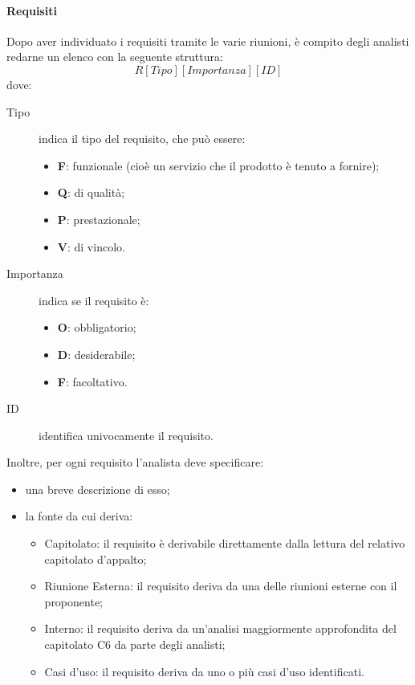 \paragraph{Requisiti} 
Dopo aver individuato i requisiti tramite le varie riunioni, è compito degli analisti redarne un elenco con la seguente struttura:
	\[R[Tipo][Importanza][ID]\]
dove:
\begin{description}
	\item[Tipo] indica il tipo del requisito, che può essere:
	\begin{itemize}
		\item \textbf{F}: funzionale (cioè un servizio che il prodotto è tenuto a fornire);
		\item \textbf{Q}: di qualità;
		\item \textbf{P}: prestazionale;
		\item \textbf{V}: di vincolo.
	\end{itemize}
	\item[Importanza] indica se il requisito è:
	\begin{itemize}
		\item \textbf{O}: obbligatorio;
		\item \textbf{D}: desiderabile;
		\item \textbf{F}: facoltativo. 
	\end{itemize}
	\item[ID] identifica univocamente il requisito.
\end{description}
Inoltre, per ogni requisito l'analista deve specificare:
\begin{itemize}
	\item una breve descrizione di esso;
	\item la fonte da cui deriva:
	\begin{itemize}
		\item Capitolato: il requisito è derivabile direttamente dalla lettura del relativo capitolato d'appalto;
		\item Riunione Esterna: il requisito deriva da una delle riunioni esterne con il proponente;
		\item Interno: il requisito deriva da un'analisi maggiormente approfondita del capitolato C6 da parte degli analisti;
		\item Casi d'uso: il requisito deriva da uno o più casi d'uso identificati.
	\end{itemize}
\end{itemize}
